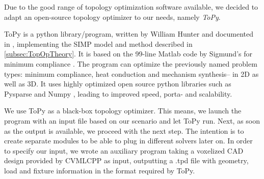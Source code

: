 \label{sec:ToPy}
Due to the good range of topology optimization software available, we decided to adapt an open-source topology optimizer to our needs, namely \emph{ToPy}.


ToPy \cite{ToPy} is a python library/program, written by William Hunter and documented in \cite{Hunter2009}, implementing the SIMP model and method described in \autoref{subsec:TopOpTheory}. It is based on the 99-line Matlab code by Sigmund's for minimum compliance \cite{sigmund200199}. The program can optimize the previously named problem types: minimum compliance, heat conduction and mechanism synthesis-- in 2D as well as 3D. It uses highly optimized open source python libraries such as Pysparse \cite{Pysparse} and Numpy \cite{Numpy}, leading to improved speed, porta- and scalability. %


We use ToPy as a black-box topology optimizer. This means, we launch the program with an input file based on our scenario and let ToPy run. Next, as soon as the output is available, we proceed with the next step. The intention is to create separate modules to be able to plug in different solvers later on. In order to specify our input, we wrote an auxiliary program taking a voxelized CAD design provided by CVMLCPP as input, outputting a .tpd file with geometry, load and fixture information in the format required by ToPy. 

